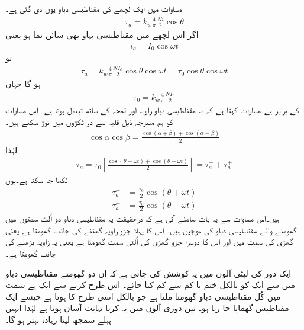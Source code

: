 مساوات   میں ایک لچھے کی مقناطیسی دباو یوں دی گئی ہے۔
\begin{align}
\tau_a=k_w \frac{4}{\pi}\frac{Ni}{2} \cos \theta
\end{align}
 اگر اس لچھے میں مقناطیسی بہاو بھی سائن نما ہو یعنی
\begin{align}
i_a=I_0 \cos \omega t
\end{align}
تو 
\begin{align}\label{مساوات_گھومتے_مشین_دباو_زاویہ_اور_وقت_پر_منحصر}
\tau_a=k_w \frac{4}{\pi} \frac{N I_0}{2} \cos \theta \cos \omega t=\tau_0 \cos \theta \cos \omega t
\end{align}
ہو گا جہاں
\begin{align}
\tau_0=k_w \frac{4}{\pi} \frac{N I_0}{2}
\end{align}
کے برابر ہے۔مساوات   کہتا ہے کہ یہ مقناطیسی دباو زاویہ  اور لمحہ  کے ساتھ تبدیل ہوتا ہے۔ اس مساوات کو ہم مندرجہ ذیل قلیہ سے دو ٹکڑوں میں توڑ سکتے ہیں۔
\begin{align*}
\cos \alpha \cos \beta =\frac{\cos (\alpha +\beta) +\cos (\alpha -\beta)}{2}
\end{align*}
لہٰذا
\begin{align}
\tau_a=\tau_0 \left [\frac{\cos (\theta +\omega t) +\cos (\theta -\omega t)}{2}\right]=\tau_a^{-}+\tau_a^{+}
\end{align}
لکھا جا سکتا ہے۔یوں
\begin{align}
\tau_a^{-}&=\frac{\tau_0}{2} \cos (\theta +\omega t)\\
\tau_a^{+}&=\frac{\tau_0}{2} \cos (\theta -\omega t)
\end{align}
ہیں۔اس مساوات سے یہ بات سامنے آتی ہے کہ درحقیقت یہ مقناطیسی دباو دو اُلٹ سمتوں میں گھومنے والے مقناطیسی دباو کی موجیں ہیں۔ اس کا پہلا جزو  زاویہ  گھٹنے کی جانب گھومتا ہے یعنی گھڑی کی سمت میں اور اس کا دوسرا جزو  گھڑی کی اُلٹی سمت گھومتا ہے یعنی یہ زاویہ بڑھنے کی جانب گھومتا ہے۔

ایک دور کی لپٹی آلوں میں یہ کوشش کی جاتی ہے کہ ان دو گھومتے مقناطیسی دباو میں سے ایک کو بالکل ختم یا کم سے کم کیا جائے۔ اس طرح کرنے سے ایک ہے سمت میں کُل مقناطیسی دباو گھومتا ملتا ہے جو بالکل اسی طرح کا ہوتا ہے جیسے ایک مقناطیس گھمایا جا رہا ہو۔ تین دوری  آلوں میں یہ کرنا نہایت آسان ہوتا ہے لہٰذا انہیں پہلے سمجھ لینا زیادہ بہتر ہو گا۔

